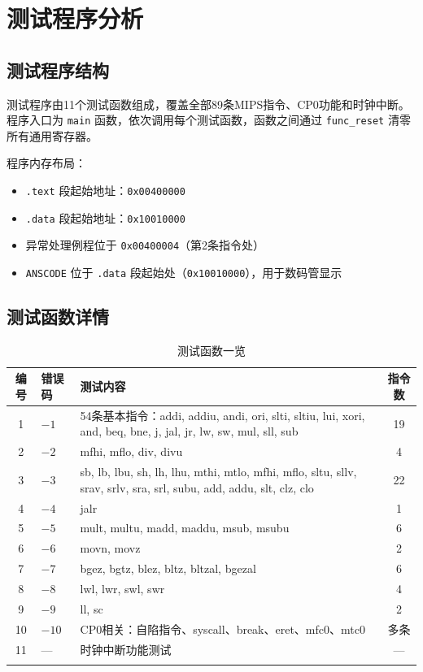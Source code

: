 \section{测试程序分析}

\subsection{测试程序结构}

测试程序由11个测试函数组成，覆盖全部89条MIPS指令、CP0功能和时钟中断。程序入口为 \texttt{main} 函数，依次调用每个测试函数，函数之间通过 \texttt{func\_reset} 清零所有通用寄存器。

程序内存布局：
\begin{itemize}[leftmargin=2em]
    \item \texttt{.text} 段起始地址：\texttt{0x00400000}
    \item \texttt{.data} 段起始地址：\texttt{0x10010000}
    \item 异常处理例程位于 \texttt{0x00400004}（第2条指令处）
    \item \texttt{ANSCODE} 位于 \texttt{.data} 段起始处（\texttt{0x10010000}），用于数码管显示
\end{itemize}

\subsection{测试函数详情}

\begin{longtable}{clp{8cm}c}
    \toprule
    \textbf{编号} & \textbf{错误码} & \textbf{测试内容} & \textbf{指令数} \\
    \midrule
    \endhead
    1 & $-1$ & 54条基本指令：addi, addiu, andi, ori, slti, sltiu, lui, xori, and, beq, bne, j, jal, jr, lw, sw, mul, sll, sub & 19 \\
    2 & $-2$ & mfhi, mflo, div, divu & 4 \\
    3 & $-3$ & sb, lb, lbu, sh, lh, lhu, mthi, mtlo, mfhi, mflo, sltu, sllv, srav, srlv, sra, srl, subu, add, addu, slt, clz, clo & 22 \\
    4 & $-4$ & jalr & 1 \\
    5 & $-5$ & mult, multu, madd, maddu, msub, msubu & 6 \\
    6 & $-6$ & movn, movz & 2 \\
    7 & $-7$ & bgez, bgtz, blez, bltz, bltzal, bgezal & 6 \\
    8 & $-8$ & lwl, lwr, swl, swr & 4 \\
    9 & $-9$ & ll, sc & 2 \\
    10 & $-10$ & CP0相关：自陷指令、syscall、break、eret、mfc0、mtc0 & 多条 \\
    11 & --- & 时钟中断功能测试 & --- \\
    \bottomrule
    \caption{测试函数一览}
\end{longtable}


